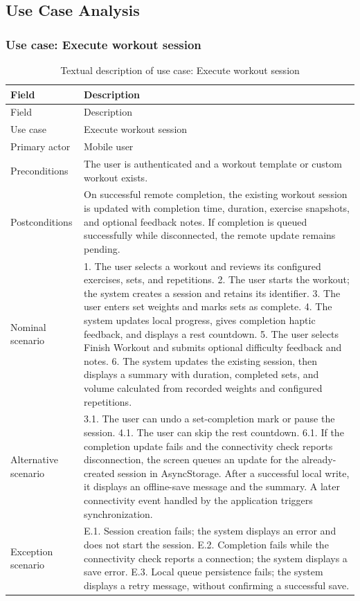 \documentclass[12pt,a4paper,openany]{report}
\begin{document}
\subsection{Use Case Analysis}

\subsubsection{Use case: Execute workout session}

\begingroup
\footnotesize
\setlength{\tabcolsep}{3pt}
\renewcommand{\arraystretch}{1.20}
\setlength{\LTpre}{5pt}
\setlength{\LTpost}{10pt}
\begin{longtable}{|L{4.95cm}|L{10.05cm}|}
\caption{Textual description of use case: Execute workout session}\label{tab:pdf-34-17} \\
\hline
{}
Field & Description \\ \hline
\endfirsthead
\hline
{}
Field & Description \\ \hline
\endhead
Use case & Execute workout session \\ \hline
Primary actor & Mobile user \\ \hline
Preconditions & The user is authenticated and a workout template or custom workout exists. \\ \hline
Postconditions & On successful remote completion, the existing workout session is updated with completion time, duration, exercise snapshots, and optional feedback notes. If completion is queued successfully while disconnected, the remote update remains pending. \\ \hline
Nominal scenario & 1. The user selects a workout and reviews its configured exercises, sets, and repetitions. 2. The user starts the workout; the system creates a session and retains its identifier. 3. The user enters set weights and marks sets as complete. 4. The system updates local progress, gives completion haptic feedback, and displays a rest countdown. 5. The user selects Finish Workout and submits optional difficulty feedback and notes. 6. The system updates the existing session, then displays a summary with duration, completed sets, and volume calculated from recorded weights and configured repetitions. \\ \hline
Alternative scenario & 3.1. The user can undo a set-completion mark or pause the session. 4.1. The user can skip the rest countdown. 6.1. If the completion update fails and the connectivity check reports disconnection, the screen queues an update for the already-created session in AsyncStorage. After a successful local write, it displays an offline-save message and the summary. A later connectivity event handled by the application triggers synchronization. \\ \hline
Exception scenario & E.1. Session creation fails; the system displays an error and does not start the session. E.2. Completion fails while the connectivity check reports a connection; the system displays a save error. E.3. Local queue persistence fails; the system displays a retry message, without confirming a successful save. \\ \hline
\end{longtable}
\endgroup
\end{document}
